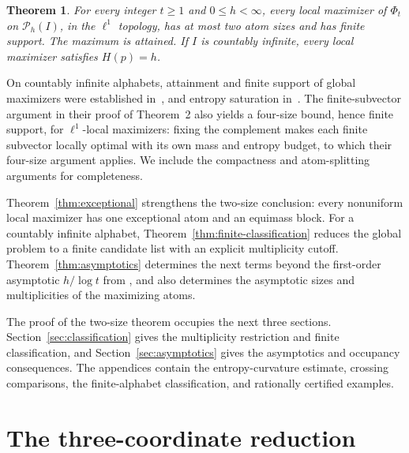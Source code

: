 \documentclass[11pt]{article}
\numberwithin{equation}{section}
\newtheorem{theorem}{Theorem}[section]
\begin{document}
\begin{theorem}\label{thm:main}
For every integer $t\ge1$ and $0\le h<\infty$, every local maximizer of
$\Phi_t$ on $\mathcal P_h(I)$, in the $\ell^1$ topology, has at most two
atom sizes and has finite support. The maximum is attained. If $I$ is
countably infinite, every local maximizer satisfies $H(p)=h$.
\end{theorem}

On countably infinite alphabets, attainment and finite support of global
maximizers were established in~\cite[Theorem~2]{BKZ}, and entropy saturation
in~\cite[Proposition~1 and Corollary~1]{BKZ}. The finite-subvector argument in
their proof of Theorem~2 also yields a four-size bound, hence finite support,
for $\ell^1$-local maximizers: fixing the complement makes each finite
subvector locally optimal with its own mass and entropy budget, to which
their four-size argument applies. We include the compactness and
atom-splitting arguments for completeness.

Theorem~\ref{thm:exceptional} strengthens the two-size conclusion: every
nonuniform local maximizer has one exceptional atom and an equimass block.
For a countably infinite alphabet, Theorem~\ref{thm:finite-classification}
reduces the global problem to a finite candidate list with an explicit
multiplicity cutoff. Theorem~\ref{thm:asymptotics} determines
the next terms beyond the first-order asymptotic $h/\log t$ from
\cite[Theorems~3--4]{BKZ}, and also determines the asymptotic sizes and
multiplicities of the maximizing atoms.

The proof of the two-size theorem occupies the next three sections.
Section~\ref{sec:classification} gives the multiplicity restriction and
finite classification, and Section~\ref{sec:asymptotics} gives the
asymptotics and occupancy consequences. The appendices contain the
entropy-curvature estimate, crossing comparisons, the finite-alphabet
classification, and rationally certified examples.

\section{The three-coordinate reduction}\label{sec:three-coordinate}
\end{document}
